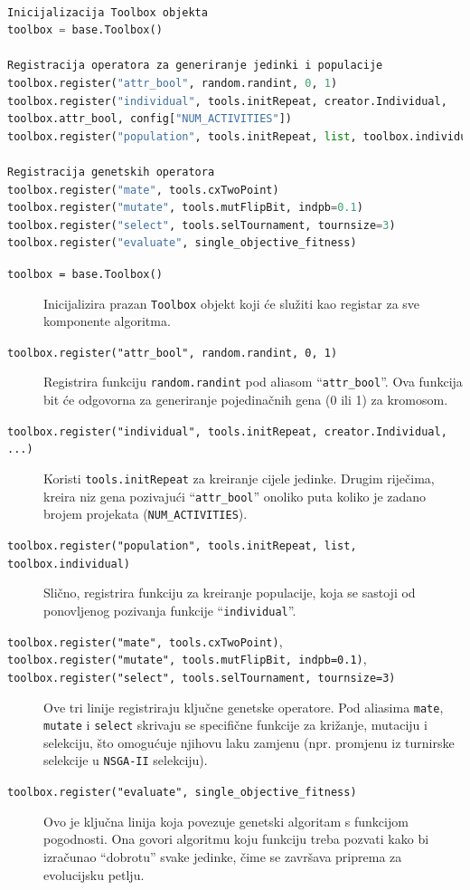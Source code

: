\begin{lstlisting}[float, language=Python, caption={Primjer konfiguracije DEAP Toolbox-a za genetske operatore.}, label={lst:toolbox}, captionpos=b]

Inicijalizacija Toolbox objekta
toolbox = base.Toolbox()

Registracija operatora za generiranje jedinki i populacije
toolbox.register("attr_bool", random.randint, 0, 1)
toolbox.register("individual", tools.initRepeat, creator.Individual,
toolbox.attr_bool, config["NUM_ACTIVITIES"])
toolbox.register("population", tools.initRepeat, list, toolbox.individual)

Registracija genetskih operatora
toolbox.register("mate", tools.cxTwoPoint)
toolbox.register("mutate", tools.mutFlipBit, indpb=0.1)
toolbox.register("select", tools.selTournament, tournsize=3)
toolbox.register("evaluate", single_objective_fitness)
\end{lstlisting}

\begin{description}
    \item[\texttt{toolbox = base.Toolbox()}] Inicijalizira prazan \texttt{Toolbox} objekt koji će služiti kao registar za sve komponente algoritma.
    \item[\texttt{toolbox.register("attr\_bool", random.randint, 0, 1)}] Registrira funkciju \texttt{random.randint} pod aliasom ``\texttt{attr\_bool}''. Ova funkcija bit će odgovorna za generiranje pojedinačnih gena (0 ili 1) za kromosom.
    \item[\texttt{toolbox.register("individual", tools.initRepeat, creator.Individual, ...)}] Koristi \texttt{tools.initRepeat} za kreiranje cijele jedinke. Drugim riječima, kreira niz gena pozivajući ``\texttt{attr\_bool}'' onoliko puta koliko je zadano brojem projekata (\texttt{NUM\_ACTIVITIES}).
    \item[\texttt{toolbox.register("population", tools.initRepeat, list, toolbox.individual)}] Slično, registrira funkciju za kreiranje populacije, koja se sastoji od ponovljenog pozivanja funkcije ``\texttt{individual}''.
    \item[\texttt{toolbox.register("mate", tools.cxTwoPoint)},] 
    \item[\texttt{toolbox.register("mutate", tools.mutFlipBit, indpb=0.1)},] 
    \item[\texttt{toolbox.register("select", tools.selTournament, tournsize=3)}] Ove tri linije registriraju ključne genetske operatore. Pod aliasima \texttt{mate}, \texttt{mutate} i \texttt{select} skrivaju se specifične funkcije za križanje, mutaciju i selekciju, što omogućuje njihovu laku zamjenu (npr. promjenu iz turnirske selekcije u \texttt{NSGA-II} selekciju).
    \item[\texttt{toolbox.register("evaluate", single\_objective\_fitness)}] Ovo je ključna linija koja povezuje genetski algoritam s funkcijom pogodnosti. Ona govori algoritmu koju funkciju treba pozvati kako bi izračunao ``dobrotu'' svake jedinke, čime se završava priprema za evolucijsku petlju.
\end{description}


